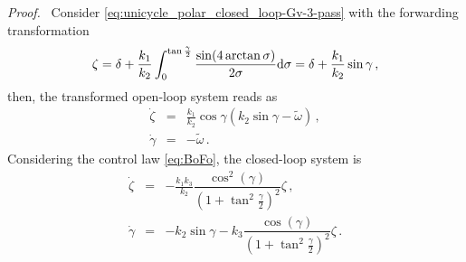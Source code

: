 \documentclass[journal,twoside,web]{ieeecolor}
\theoremstyle{definition}
\renewenvironment{proof}[1][Proof]{\par\pushQED{\qed}\normalfont\textit{#1.}~}{\popQED\par}
\begin{document}
\begin{proof}
Consider \eqref{eq:unicycle_polar_closed_loop-Gv-3-pass}
with the forwarding transformation
\begin{equation}
\zeta = \delta + \frac{k_1}{k_2}\int_0^{\tan\frac{\gamma}{2}} \frac{\sin(4\arctan\sigma)}{2\sigma}{\rm d}\sigma = \delta + \dfrac{k_1}{k_2} \sin \gamma \,,
\end{equation}
then, the transformed open-loop system reads as
\begin{eqnarray}
\dot\zeta &=& \frac{k_1}{k_2}\cos\gamma\left(k_2\sin\gamma -%
\tilde\omega \right) \,,
\\
\dot\gamma &=& -  \tilde\omega\,.
\end{eqnarray}
Considering the control law \eqref{eq:BoFo}, 
the closed-loop system is
\begin{subequations}
    \label{eq:bofo_closed_loop}
\begin{eqnarray}
\dot\zeta &=& -\frac{k_1k_3}{k_2}\dfrac{\cos^2(\gamma)}{\left(1+\tan^2\frac{\gamma}{2}\right)^2} \zeta \,,
\\
\dot\gamma &=& - k_2\sin\gamma - k_3\dfrac{\cos(\gamma)}{\left(1+\tan^2\frac{\gamma}{2}\right)^2}\zeta\,.

\end{eqnarray}
\end{subequations}
\end{proof}
\end{document}
